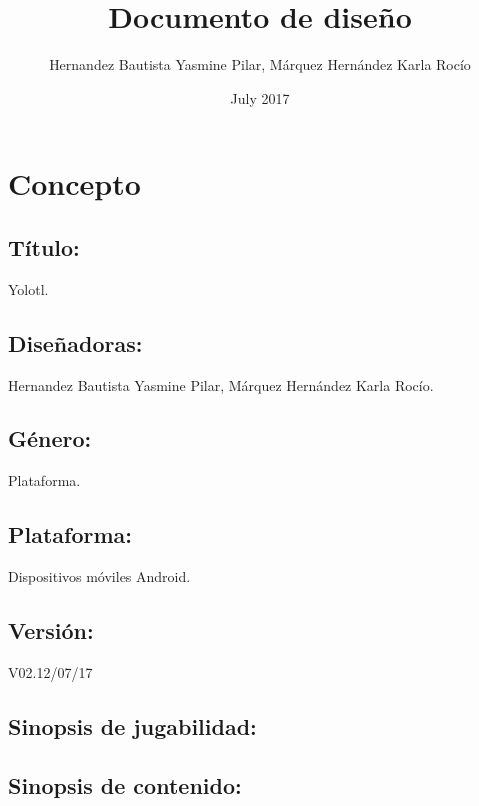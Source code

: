 \documentclass{article}
\title{Documento de diseño}
\author{Hernandez Bautista Yasmine Pilar, Márquez Hernández Karla Rocío}
\date{July 2017}
\begin{document}
\maketitle

\section{Concepto}
    \subsection{Título:} Yolotl.
    \subsection{Diseñadoras:} Hernandez Bautista Yasmine Pilar, Márquez Hernández Karla Rocío.
    \subsection{Género:} Plataforma.
    \subsection{Plataforma:} Dispositivos móviles Android.
    \subsection{Versión:} V02.12/07/17
    \subsection{Sinopsis de jugabilidad:} 
    \subsection{Sinopsis de contenido:} 
\end{document}

